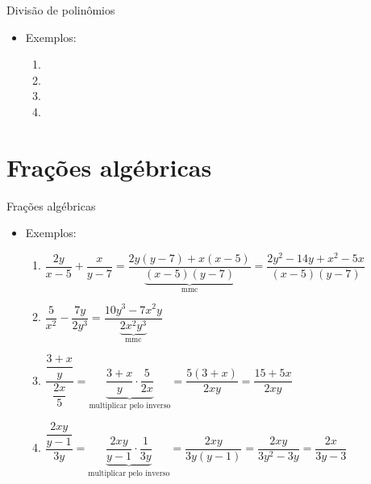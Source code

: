 \documentclass[14pt, aspectratio=169]{beamer}
\newcommand{\skipframe}{\vspace{10.0cm}}
\begin{document}
\begin{frame}[allowframebreaks]{Divisão de polinômios}
    \begin{itemize}
        \item Exemplos:
        \vspace{0.25cm}

        \begin{enumerate}[a]
            \item {}
            \skipframe
            \item {}
            \skipframe
            \item {}
            \skipframe
            \item {}
        \end{enumerate}
    \end{itemize} 
\end{frame}

\section{Frações algébricas}

\begin{frame}[allowframebreaks]{Frações algébricas}
    \begin{itemize}
        \item Exemplos:
        \begin{enumerate}[a]
            \item $\dfrac{2y}{x-5} + \dfrac{x}{y-7} = \dfrac{2y(y-7)+x(x-5)}{\underbrace{(x-5)(y-7)}_{\text{mmc}}} = \dfrac{2y^2-14y+x^2-5x}{(x-5)(y-7)}$
            \item $\dfrac{5}{x^2} - \dfrac{7y}{2y^3} = \dfrac{10y^3-7x^2y}{\underbrace{2x^2y^3}_{\text{mmc}}}$

            \skipframe

            \item $\dfrac{\dfrac{3+x}{y}}{\dfrac{2x}{5}} = \underbrace{\dfrac{3+x}{y} \cdot \dfrac{5}{2x}}_{\text{multiplicar pelo inverso}}  = \dfrac{5(3+x)}{2xy} = \dfrac{15+5x}{2xy}$
            \item $\dfrac{\dfrac{2xy}{y-1}}{3y} = \underbrace{\dfrac{2xy}{y-1} \cdot \dfrac{1}{3y}}_{\text{multiplicar pelo inverso}} = \dfrac{2xy}{3y(y-1)} = \dfrac{2xy}{3y^2-3y} = \dfrac{2x}{3y-3}$
        \end{enumerate}
    \end{itemize}
\end{frame}
\end{document}

